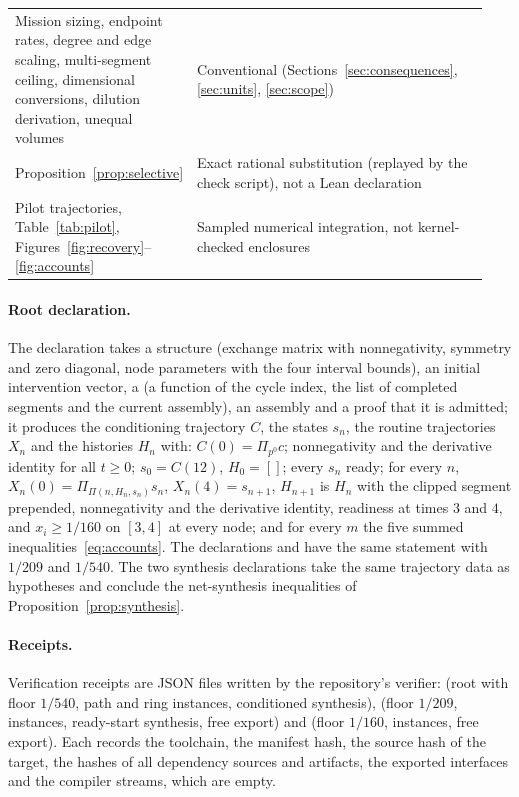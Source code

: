 \documentclass[11pt,a4paper]{article}
\theoremstyle{plain}
\theoremstyle{definition}
\theoremstyle{remark}
\newcommand{\Pulse}{\Pi}
\begin{document}
\begin{longtable}{>{\raggedright\arraybackslash}p{0.30\linewidth}>{\raggedright\arraybackslash}p{0.64\linewidth}}
Mission sizing, endpoint rates, degree and edge scaling, multi-segment ceiling, dimensional conversions, dilution derivation, unequal volumes & Conventional (Sections~\ref{sec:consequences}, \ref{sec:units}, \ref{sec:scope})\\
Proposition~\ref{prop:selective} & Exact rational substitution (replayed by the check script), not a Lean declaration\\
Pilot trajectories, Table~\ref{tab:pilot}, Figures~\ref{fig:recovery}--\ref{fig:accounts} & Sampled numerical integration, not kernel-checked enclosures\\
\bottomrule
\end{longtable}

\paragraph{Root declaration.}
The declaration  takes a  structure (exchange matrix with nonnegativity, symmetry and zero diagonal, node parameters with the four interval bounds), an initial intervention vector, a  (a function of the cycle index, the list of completed segments and the current assembly), an assembly and a proof that it is admitted; it produces the conditioning trajectory $C$, the states $s_n$, the routine trajectories $X_n$ and the histories $H_n$ with: $C(0)=\Pulse_{p^0}c$; nonnegativity and the derivative identity for all $t\ge0$; $s_0=C(12)$, $H_0=[]$; every $s_n$ ready; for every $n$, $X_n(0)=\Pulse_{\Pi(n,H_n,s_n)}s_n$, $X_n(4)=s_{n+1}$, $H_{n+1}$ is $H_n$ with the clipped segment prepended, nonnegativity and the derivative identity, readiness at times $3$ and $4$, and $x_i\ge1/160$ on $[3,4]$ at every node; and for every $m$ the five summed inequalities~\eqref{eq:accounts}. The declarations  and  have the same statement with $1/209$ and $1/540$. The two synthesis declarations take the same trajectory data as hypotheses and conclude the net-synthesis inequalities of Proposition~\ref{prop:synthesis}.

\paragraph{Receipts.}
Verification receipts are JSON files written by the repository's verifier:  (root with floor $1/540$, path and ring instances, conditioned synthesis),  (floor $1/209$, instances, ready-start synthesis, free export) and  (floor $1/160$, instances, free export). Each records the toolchain, the manifest hash, the source hash of the target, the hashes of all dependency sources and artifacts, the exported interfaces and the compiler streams, which are empty.
\end{document}
